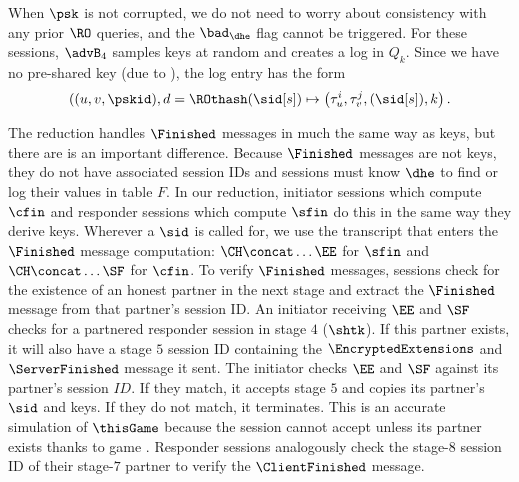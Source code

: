 When $\psk$ is not corrupted, we do not need to worry about consistency with any prior $\RO$ queries, and the $\bad_{\dhe}$ flag cannot be triggered.
For these sessions, $\advB_4$ samples keys at random and creates a log in $Q_k$.
Since we have no pre-shared key (due to ), the log entry has the form 
\[
((u,v,\pskid), d = \ROthash(\sid[s]) \mapsto \left(  \tau_u^i, \tau_v^j, (\sid[s]), k \right).
\]

The reduction handles $\Finished$ messages in much the same way as keys, but there are is an important difference.
Because $\Finished$ messages are not keys, they do not have associated session IDs and sessions must know $\dhe$ to find or log their values in table $F$.
In our reduction, initiator sessions which compute $\cfin$ and responder sessions which compute $\sfin$ do this in the same way they derive keys.
Wherever a $\sid$ is called for, we use the transcript that enters the $\Finished$ message computation: $\CH \concat \ldots \EE$ for $\sfin$ and $\CH \concat \ldots \SF$ for $\cfin$.
To verify $\Finished$ messages, sessions check for the existence of an honest partner in the next stage and extract the $\Finished$ message from that partner's session ID.
An initiator receiving $\EE$ and $\SF$ checks for a partnered responder session in stage $4$ ($\shtk$). If this partner exists, it will also have a stage $5$ session ID containing the $\EncryptedExtensions$ and $\ServerFinished$ message it sent.
The initiator checks $\EE$ and $\SF$ against its partner's session $ID$. If they match, it accepts stage $5$ and copies its partner's $\sid$ and keys. 
If they do not match, it terminates.
This is an accurate simulation of $\thisGame$ because the session cannot accept unless its partner exists thanks to game .
Responder sessions analogously check the stage-$8$ session ID of their stage-$7$ partner to verify the $\ClientFinished$ message.

